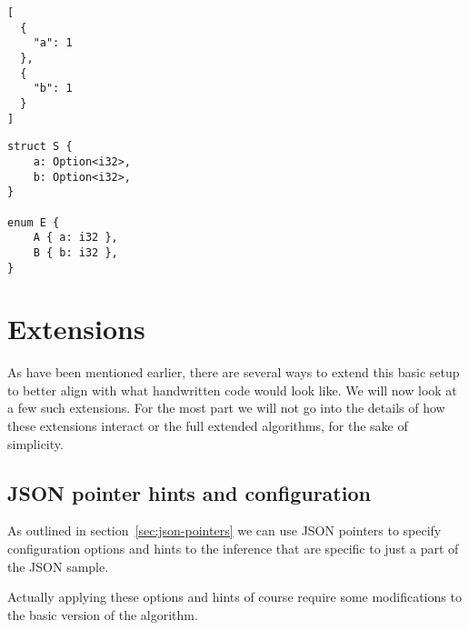 \begin{listing}[ht!]
\begin{verbatim}
[
  {
    "a": 1
  },
  {
    "b": 1
  }
]
\end{verbatim}
\caption{JSON Dilemma \#1}
\label{lst:json-dilemma-1}
\end{listing}

\begin{listing}[ht!]
\begin{verbatim}
struct S {
    a: Option<i32>,
    b: Option<i32>,
}

enum E {
    A { a: i32 },
    B { b: i32 },
}
\end{verbatim}
\caption{JSON Dilemma \#1 - Two solutions}
\label{lst:json-dilemma-1-rs}
\end{listing}

\section{Extensions}
\label{sec:extensions}

As have been mentioned earlier, there are several ways to extend this basic setup to better align with what handwritten code would look like. We will now look at a few such extensions. For the most part we will not go into the details of how these extensions interact or the full extended algorithms, for the sake of simplicity.



\subsection{JSON pointer hints and configuration}
\label{sec:ext-json-pointers}

As outlined in section~\ref{sec:json-pointers} we can use JSON pointers to specify configuration options and hints to the inference that are specific to just a part of the JSON sample.

Actually applying these options and hints of course require some modifications to the basic version of the algorithm.




